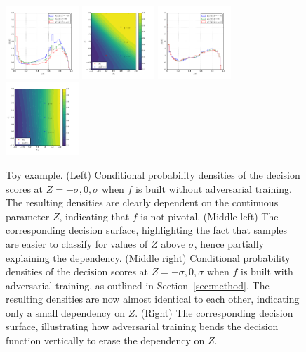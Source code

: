 \documentclass[twocolumn,superscriptaddress,aps]{revtex4-1}
\theoremstyle{plain}
\begin{document}
\begin{figure}
    \begin{center}
        \includegraphics[width=0.245\textwidth]{figures/f-plain.pdf}
        \includegraphics[width=0.245\textwidth]{figures/surface-plain.pdf}
        \includegraphics[width=0.245\textwidth]{figures/f-adversary.pdf}
        \includegraphics[width=0.245\textwidth]{figures/surface-adversary.pdf}
    \end{center}
    \vspace{-0.5cm}
    \caption{Toy example.
    (Left) Conditional probability densities of the decision scores at $Z=-\sigma, 0, \sigma$
       when $f$ is built without adversarial training. The resulting densities
       are clearly dependent on the continuous parameter $Z$, indicating that $f$ is not pivotal.
    (Middle left) The corresponding decision surface, highlighting
       the fact that samples are easier to classify for values of $Z$ above $\sigma$,
       hence partially explaining the dependency.
    (Middle right) Conditional probability densities of the decision scores at $Z=-\sigma, 0, \sigma$ when $f$ is
       built with adversarial training, as outlined in Section~\ref{sec:method}.
       The resulting densities are now almost identical to each other, indicating only a
       small dependency on $Z$.
    (Right) The corresponding decision surface, illustrating how adversarial
       training bends the decision function vertically to erase the dependency on $Z$.
    }
    \label{fig:toy}
\end{figure}
\end{document}
